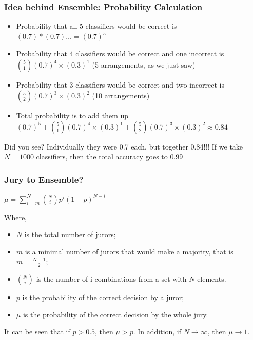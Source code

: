 \begin{frame}[fragile]\frametitle{Idea behind Ensemble: Probability Calculation}
\begin{itemize}
\item Probability that all 5 classifiers would be correct is $ (0.7) * (0.7) \ldots = (0.7)^5$

\item Probability that 4 classifiers would be correct and one incorrect is ${5 \choose 1} (0.7)^4  \times (0.3)^1$ (5 arrangements, as we just saw)
\item Probability that 3 classifiers would be correct and two incorrect is ${5 \choose 2}  (0.7)^3 \times (0.3)^2$ (10 arrangements)

\item Total probability is to add them up = $(0.7)^5 + {5 \choose 1} (0.7)^4  \times (0.3)^1 + {5 \choose 2} (0.7)^3 \times (0.3)^2 \approx 0.84$
\end{itemize}
Did you see? Individually they were 0.7 each, but together 0.84!!! If we take $N = 1000$ classifiers, then the total accuracy goes to 0.99
\end{frame}




\begin{frame}[fragile]\frametitle{Jury to Ensemble?}

$\mu = \sum_{i=m}^{N}{N\choose i}p^i(1-p)^{N-i}$

Where,
\begin{itemize}
\item $N$ is the total number of jurors;
\item $m$ is a minimal number of jurors that would make a majority, that is $m = \frac{N + 1}{2}$;
\item ${N \choose i}$ is the number of i-combinations from a set with $N$ elements.
\item $p$ is the probability of the correct decision by a juror;
\item $\mu$ is the probability of the correct decision by the whole jury.
\end{itemize}

It can be seen that if $p>0.5$, then $\mu >p$. In addition, if $N \rightarrow \infty$, then $\mu \rightarrow 1$.
\end{frame}

